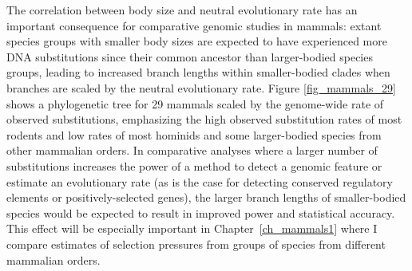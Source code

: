 The correlation between body size and neutral evolutionary rate has an
important consequence for comparative genomic studies in mammals:
extant species groups with smaller body sizes are expected to have
experienced more DNA substitutions since their common ancestor than
larger-bodied species groups, leading to increased branch lengths
within smaller-bodied clades when branches are scaled by the neutral
evolutionary rate. Figure \ref{fig_mammals_29} shows a phylogenetic
tree for 29 mammals scaled by the genome-wide rate of observed
substitutions, emphasizing the high observed substitution rates of
most rodents and low rates of most hominids and some larger-bodied
species from other mammalian orders. In comparative analyses where a
larger number of substitutions increases the power of a method to
detect a genomic feature or estimate an evolutionary rate (as is the
case for detecting conserved regulatory elements or
positively-selected genes), the larger branch lengths of
smaller-bodied species would be expected to result in improved power
and statistical accuracy. This effect will be especially important in
Chapter~\ref{ch_mammals1} where I compare \sw estimates of selection
pressures from groups of species from different mammalian orders.

